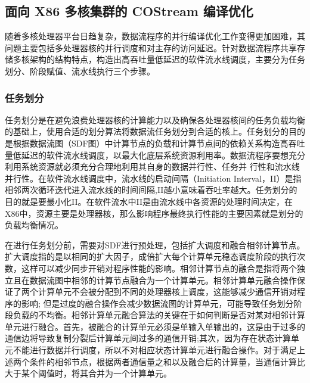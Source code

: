 \subsection{面向 X86 多核集群的 COStream 编译优化} \label{section:x86}

随着多核处理器平台日趋复杂，数据流程序的并行编译优化工作变得更加困难，其问题主要包括多处理器核的并行调度和对主存的访问延迟。针对数据流程序共享存储多核架构的结构特点，构造出高吞吐量低延迟的软件流水线调度，主要分为任务划分、阶段赋值、流水线执行三个步骤。

\subsubsection{任务划分}

任务划分是在避免浪费处理器核的计算能力以及确保各处理器核间的任务负载均衡的基础上，使用合适的划分算法将数据流任务划分到合适的核上。任务划分的目的是根据数据流图（SDF图）中计算节点的负载和计算节点间的依赖关系构造高吞吐量低延迟的软件流水线调度，以最大化底层系统资源利用率。数据流程序要想充分利用系统资源就必须充分合理地利用其自身的数据并行性、任务并 行性和流水线并行性。在软件流水线调度中，流水线的启动间隔（Initiation Interval，II）是指相邻两次循环迭代进入流水线的时间间隔,II越小意味着吞吐率越大。任务划分的目的就是要最小化II。在软件流水中II是由流水线中各资源的处理时间决定，在X86中，资源主要是处理器核，那么影响程序最终执行性能的主要因素就是划分的负载均衡情况。

在进行任务划分前，需要对SDF进行预处理，包括扩大调度和融合相邻计算节点。扩大调度指的是以相同的扩大因子，成倍扩大每个计算单元稳态调度阶段的执行次数，这样可以减少同步开销对程序性能的影响。相邻计算节点的融合是指将两个独立且在数据流图中相邻的计算节点融合为一个计算单元。相邻计算单元融合操作保证了两个计算单元不会被分配到不同的处理器核上调度，这能够减少通信开销对程序的影响; 但是过度的融合操作会减少数据流图的计算单元，可能导致任务划分阶段负载的不均衡。相邻计算单元融合算法的关键在于如何判断是否对某对相邻计算单元进行融合。首先，被融合的计算单元必须是单输入单输出的，这是由于过多的通信边将导致复制分裂后计算单元间过多的通信开销;其次，因为存在状态计算单元不能进行数据并行调度，所以不对相应状态计算单元进行融合操作。对于满足上述两个条件的相邻节点，根据两者通信量之和以及融合后的计算量，当通信计算比大于某个阈值时，将其合并为一个计算单元。

